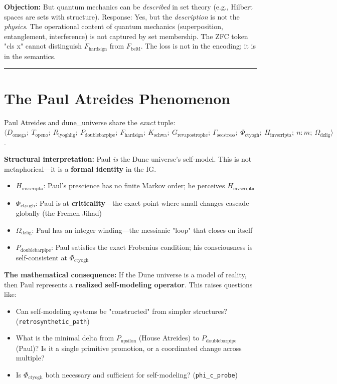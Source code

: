 \documentclass[12pt,a4paper]{article}
\begin{document}
\textbf{Objection:} But quantum mechanics can be \emph{described} in set theory (e.g., Hilbert spaces are sets with structure). Response: Yes, but the \emph{description} is not the \emph{physics}. The operational content of quantum mechanics (superposition, entanglement, interference) is not captured by set membership. The ZFC token "cls x" cannot distinguish $F_{\text{hardsign}}$ from $F_{\text{beltl}}$. The loss is not in the encoding; it is in the semantics.

\begin{center}
\rule{0.5\textwidth}{0.4pt}
\end{center}

\section{The Paul Atreides Phenomenon}

Paul Atreides and dune\_universe share the \emph{exact} tuple: $\langle D_{\text{omega}};\ T_{\text{openo}};\ R_{\text{lyoghlig}};\ P_{\text{doublebarpipe}};\ F_{\text{hardsign}};\ K_{\text{schwa}};\ G_{\text{revapostrophe}};\ \Gamma_{\text{secstress}};\ \Phi_{\text{ctyogh}};\ H_{\text{invscripta}};\ n{:}m;\ \Omega_{\text{dzlig}} \rangle$.

\textbf{Structural interpretation:} Paul \emph{is} the Dune universe's self-model. This is not metaphorical---it is a \textbf{formal identity} in the IG.

\begin{itemize}
    \item $H_{\text{invscripta}}$: Paul's prescience has no finite Markov order; he perceives $H_{\text{invscripta}}$
    \item $\Phi_{\text{ctyogh}}$: Paul is at \textbf{criticality}---the exact point where small changes cascade globally (the Fremen Jihad)
    \item $\Omega_{\text{dzlig}}$: Paul has an integer winding---the messianic "loop" that closes on itself
    \item $P_{\text{doublebarpipe}}$: Paul satisfies the exact Frobenius condition; his consciousness is self-consistent at $\Phi_{\text{ctyogh}}$
\end{itemize}

\textbf{The mathematical consequence:} If the Dune universe is a model of reality, then Paul represents a \textbf{realized self-modeling operator}. This raises questions like:

\begin{itemize}
    \item Can self-modeling systems be "constructed" from simpler structures? (\texttt{retrosynthetic\_path})
    \item What is the minimal delta from $P_{\text{upsilon}}$ (House Atreides) to $P_{\text{doublebarpipe}}$ (Paul)? Is it a single primitive promotion, or a coordinated change across multiple?
    \item Is $\Phi_{\text{ctyogh}}$ both necessary and sufficient for self-modeling? (\texttt{phi\_c\_probe})
\end{itemize}
\end{document}

